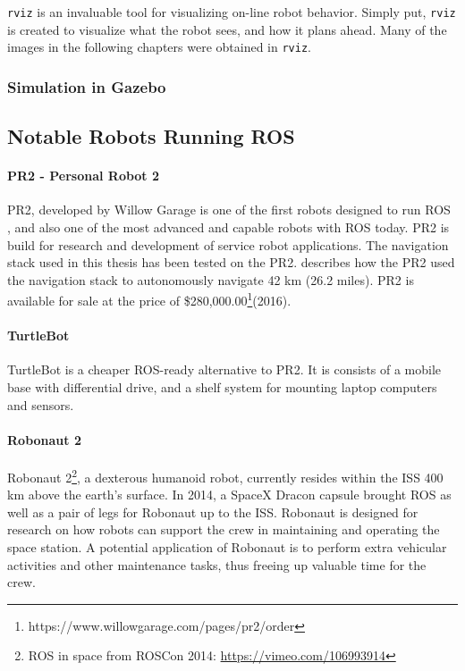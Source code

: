 \texttt{rviz} is an invaluable tool for visualizing on-line robot behavior. Simply put, \texttt{rviz} is created to visualize what the robot sees, and how it plans ahead. Many of the images in the following chapters were obtained in \texttt{rviz}. 

\subsubsection{Simulation in Gazebo}


\subsection{Notable Robots Running ROS}

\paragraph{PR2 - Personal Robot 2}

PR2, developed by Willow Garage is one of the first robots designed to run \ac{ROS} \cite{rosbook15}, and also one of the most advanced and capable robots with \ac{ROS} today. PR2 is build for research and development of service robot applications. The navigation stack used in this thesis has been tested on the PR2. \cite{tbd} describes how the PR2 used the navigation stack to autonomously navigate 42 km (26.2 miles). PR2 is available for sale at the price of \$280,000.00\footnote{https://www.willowgarage.com/pages/pr2/order}(2016).

\paragraph{TurtleBot} 

TurtleBot is a cheaper ROS-ready alternative to PR2. It is consists of a mobile base with differential drive, and a shelf system for mounting laptop computers and sensors.

\paragraph{Robonaut 2}

Robonaut 2\footnote{\ac{ROS} in space from ROSCon 2014: \url{https://vimeo.com/106993914}}, a dexterous humanoid robot, currently resides within the \ac{ISS} 400 km above the earth's surface. In 2014, a SpaceX Dracon capsule brought \ac{ROS} as well as a pair of legs for Robonaut up to the \ac{ISS}\cite{ROS_space}. Robonaut is designed for research on how robots can support the crew in maintaining and operating the space station. A potential application of Robonaut is to perform extra vehicular activities and other maintenance tasks, thus freeing up valuable time for the crew.

